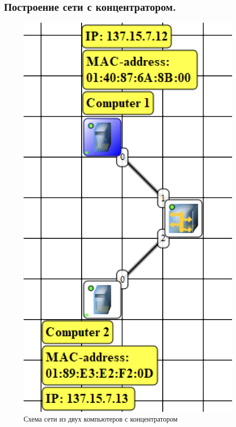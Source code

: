 \documentclass[12pt,onecolumn]{article}
\begin{document}
\subsection{Построение сети с концентратором.}
\begin{figure}[H]
    \centering
    \includegraphics[scale=0.5]{image/part1/topology.png}
    \caption{Схема сети из двух компьютеров с концентратором}
\end{figure}
\end{document}
